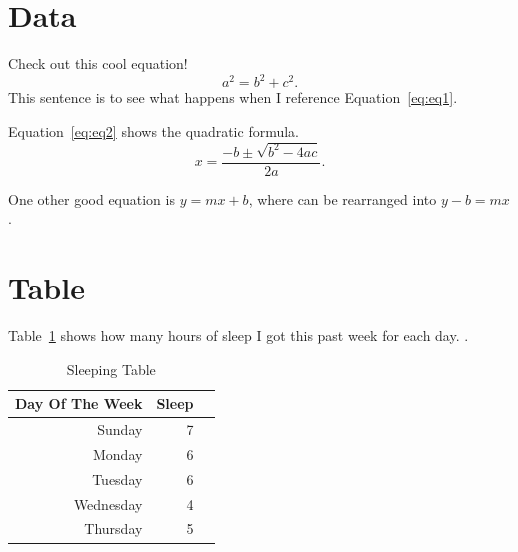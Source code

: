 \documentclass[12pt]{article}
\begin{document}
\section{Data}
\label{sec:data}

Check out this cool equation!
\begin{equation}
  \label{eq:eq1}
  a^{2}=b^{2}+c^{2}.
\end{equation}
This sentence is to see what happens when I reference Equation~\ref{eq:eq1}.
\lipsum[1]

Equation~\ref{eq:eq2} shows the quadratic formula.
\begin{equation}
  \label{eq:eq2}
  x=\frac{-b\pm\sqrt{b^2-4ac}}{2a}.
\end{equation}

One other good equation is \(y=mx+b\), where can be rearranged into \(y-b=mx\).


\section{Table}
\label{sec:table}

Table~\ref{tab:sleep} shows how many hours of sleep I got this past week for each day.
\lipsum[1-4].

\begin{table}[tbp]
	\caption{Sleeping Table}
	\label{tab:sleep}
\centering
\begin{tabular}{rrr}
	\toprule
Day Of The Week & Sleep \\
	\midrule
Sunday & 7 \\
Monday & 6 \\
Tuesday & 6 \\
Wednesday & 4 \\
Thursday & 5 \\
	\bottomrule
\end{tabular}
\end{table}
\end{document}
